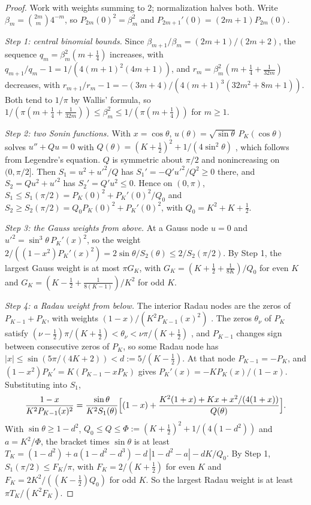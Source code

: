 \begin{proof}
Work with weights summing to $2$; normalization halves both. Write $\beta_m=\binom{2m}m4^{-m}$, so $P_{2m}(0)^2=\beta_m^2$ and $P_{2m+1}'(0)=(2m+1)P_{2m}(0)$.

\emph{Step 1: central binomial bounds.} Since $\beta_{m+1}/\beta_m=(2m+1)/(2m+2)$, the sequence $q_m=\beta_m^2(m+\frac14)$ increases, with $q_{m+1}/q_m-1=1/(4(m+1)^2(4m+1))$, and $r_m=\beta_m^2(m+\frac14+\frac1{32m})$ decreases, with $r_{m+1}/r_m-1=-(3m+4)/(4(m+1)^3(32m^2+8m+1))$. Both tend to $1/\pi$ by Wallis' formula, so $1/(\pi(m+\frac14+\frac1{32m}))\le\beta_m^2\le1/(\pi(m+\frac14))$ for $m\ge1$.

\emph{Step 2: two Sonin functions.} With $x=\cos\theta$, $u(\theta)=\sqrt{\sin\theta}\,P_K(\cos\theta)$ solves $u''+Q u=0$ with $Q(\theta)=(K+\frac12)^2+1/(4\sin^2\theta)$ \citep{szego1975}, which follows from Legendre's equation. $Q$ is symmetric about $\pi/2$ and nonincreasing on $(0,\pi/2]$. Then $S_1=u^2+u'^2/Q$ has $S_1'=-Q'u'^2/Q^2\ge0$ there, and $S_2=Qu^2+u'^2$ has $S_2'=Q'u^2\le0$. Hence on $(0,\pi)$, $S_1\le S_1(\pi/2)=P_K(0)^2+P_K'(0)^2/Q_0$ and $S_2\ge S_2(\pi/2)=Q_0P_K(0)^2+P_K'(0)^2$, with $Q_0=K^2+K+\frac12$.

\emph{Step 3: the Gauss weights from above.} At a Gauss node $u=0$ and $u'^2=\sin^3\theta\,P_K'(x)^2$, so the weight $2/((1-x^2)P_K'(x)^2)=2\sin\theta/S_2(\theta)\le2/S_2(\pi/2)$. By Step 1, the largest Gauss weight is at most $\pi G_K$, with $G_K=(K+\frac12+\frac1{8K})/Q_0$ for even $K$ and $G_K=(K-\frac12+\frac1{8(K-1)})/K^2$ for odd $K$.

\emph{Step 4: a Radau weight from below.} The interior Radau nodes are the zeros of $P_{K-1}+P_K$, with weights $(1-x)/(K^2P_{K-1}(x)^2)$ \citep[25.4.31]{abramowitz1964}. The zeros $\theta_\nu$ of $P_K$ satisfy $(\nu-\frac12)\pi/(K+\frac12)<\theta_\nu<\nu\pi/(K+\frac12)$ \citep[Theorem~6.21.2]{szego1975}, and $P_{K-1}$ changes sign between consecutive zeros of $P_K$, so some Radau node has $|x|\le\sin(5\pi/(4K+2))<d:=5/(K-\frac12)$. At that node $P_{K-1}=-P_K$, and $(1-x^2)P_K'=K(P_{K-1}-xP_K)$ gives $P_K'(x)=-KP_K(x)/(1-x)$. Substituting into $S_1$,
\[
\frac{1-x}{K^2P_{K-1}(x)^2}=\frac{\sin\theta}{K^2S_1(\theta)}\Bigl[(1-x)+\frac{K^2(1+x)+Kx+x^2/(4(1+x))}{Q(\theta)}\Bigr].
\]
With $\sin\theta\ge1-d^2$, $Q_0\le Q\le\Phi:=(K+\frac12)^2+1/(4(1-d^2))$ and $a=K^2/\Phi$, the bracket times $\sin\theta$ is at least $T_K=(1-d^2)+a(1-d^2-d^3)-d\,|1-d^2-a|-dK/Q_0$. By Step 1, $S_1(\pi/2)\le F_K/\pi$, with $F_K=2/(K+\frac12)$ for even $K$ and $F_K=2K^2/((K-\frac12)Q_0)$ for odd $K$. So the largest Radau weight is at least $\pi T_K/(K^2F_K)$.


\end{proof}
